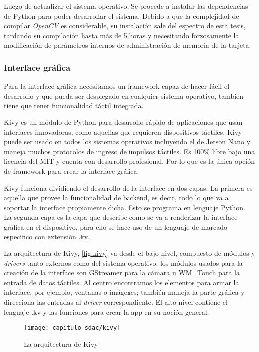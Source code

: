 Luego de actualizar el sistema operativo. Se procede a instalar las dependencias
de Python para poder desarrollar el sistema. Debido a que la complejidad de
compilar \emph{OpenCV} es considerable, su instalación sale del espectro de esta
tesis, tardando su compilación hasta más de 5 horas y necesitando forzosamente
la modificación de parámetros internos de administración de memoria de la
tarjeta.

\subsubsection{Interface gráfica}

Para la interface gráfica necesitamos un framework capaz de hacer fácil el
desarrollo y que pueda ser desplegado en cualquier sistema operativo, también
tiene que tener funcionalidad táctil integrada.

Kivy es un módulo de Python para desarrollo rápido de aplicaciones que usan
interfaces innovadoras, como aquellas que requieren dispositivos táctiles. Kivy
puede ser usado en todos los sistemas operativos incluyendo el de Jetson Nano y
maneja muchos protocolos de ingreso de impulsos táctiles. Es 100\% libre bajo
una licencia del MIT y cuenta con desarrollo profesional. Por lo que es la única
opción de framework para crear la interface gráfica.

Kivy funciona dividiendo el desarrollo de la interface en dos capas. La primera
es aquella que provee la funcionalidad de backend, es decir, todo lo que va a
soportar la interface propiamente dicha. Esto se programa en lenguaje Python. La
segunda capa es la capa que describe como se va a renderizar la interface
gráfica en el dispositivo, para ello se hace uso de un lenguaje de marcado
específico con extensión .kv.

La arquitectura de Kivy, \autoref{fig:kivy} va desde el bajo nivel, compuesto de
módulos y \emph{drivers} tanto externos como del sistema operativo; los módulos
usados para la creación de la interface son GStreamer para la cámara u WM\_Touch
para la entrada de datos táctiles. Al centro encontramos los elementos para
armar la interface, por ejemplo, ventanas o imágenes; también maneja la parte
gráfica y direcciona las entradas al \emph{driver} correspondiente. El alto
nivel contiene el lenguaje .kv y las funciones para crear la app en su noción
general.

\begin{figure}[H]
    \centering
    \texttt{[image: capitulo\_sdac/kivy]}
    \caption{La arquitectura de Kivy}\label{fig:kivy}
\end{figure}

